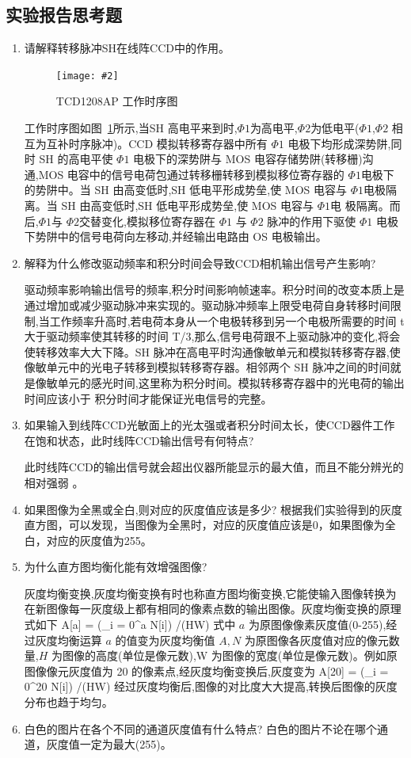 \documentclass{ctexart}
\newcommand{\cpic}[2]{
\begin{center}
\texttt{[image: \#2]}
\end{center}
}
\newcommand{\cpicn}[3]
{
\begin{figure}[H]
\cpic{#1}{#2}
\caption{#3\label{#2}}
\end{figure}
}
\begin{document}
\subsection{实验报告思考题}
\begin{enumerate}[(1)]
\item 请解释转移脉冲SH在线阵CCD中的作用。
\cpicn{0.5}{time}{TCD1208AP 工作时序图}
工作时序图如图~\ref{time}所示,当SH 高电平来到时,$\Phi 1$为高电平,$\Phi 2$为低电平($\Phi 1$,$\Phi 2$ 相互为互补时序脉冲)。CCD 模拟转移寄存器中所有 $\Phi 1$ 电极下均形成深势阱,同时 SH 的高电平使 $\Phi 1$ 电极下的深势阱与
MOS 电容存储势阱(转移栅)沟通,MOS 电容中的信号电荷包通过转移栅转移到模拟移位寄存器的 $\Phi 1$电极下的势阱中。当 SH 由高变低时,SH 低电平形成势垒,使 MOS 电容与 $\Phi 1$电极隔离。当 SH 由高变低时,SH 低电平形成势垒,使 MOS 电容与 $\Phi 1$电
极隔离。而后,$\Phi 1$与 $\Phi 2$交替变化,模拟移位寄存器在 $\Phi 1$ 与 $\Phi 2$ 脉冲的作用下驱使 $\Phi 1$
电极下势阱中的信号电荷向左移动,并经输出电路由 OS 电极输出。

\item 解释为什么修改驱动频率和积分时间会导致CCD相机输出信号产生影响?
  
  驱动频率影响输出信号的频率,积分时间影响帧速率。积分时间的改变本质上是通过增加或减少驱动脉冲来实现的。驱动脉冲频率上限受电荷自身转移时间限制,当工作频率升高时,若电荷本身从一个电极转移到另一个电极所需要的时间 t 大于驱动频率使其转移的时间 T/3,那么,信号电荷跟不上驱动脉冲的变化,将会使转移效率大大下降。SH 脉冲在高电平时沟通像敏单元和模拟转移寄存器,使像敏单元中的光电子转移到模拟转移寄存器。相邻两个 SH 脉冲之间的时间就是像敏单元的感光时间,这里称为积分时间。模拟转移寄存器中的光电荷的输出时间应该小于
积分时间才能保证光电信号的完整。

\item 如果输入到线阵CCD光敏面上的光太强或者积分时间太长，使CCD器件工作在饱和状态，此时线阵CCD输出信号有何特点?

  此时线阵CCD的输出信号就会超出仪器所能显示的最大值，而且不能分辨光的相对强弱 。
  
\item 如果图像为全黑或全白,则对应的灰度值应该是多少?
根据我们实验得到的灰度直方图，可以发现，当图像为全黑时，对应的灰度值应该是0，如果图像为全白，对应的灰度值为255。  
\item 为什么直方图均衡化能有效增强图像?

  灰度均衡变换,灰度均衡变换有时也称直方图均衡变换,它能使输入图像转换为
在新图像每一灰度级上都有相同的像素点数的输出图像。灰度均衡变换的原理式如下
\beq
A[a] = \left(\sum_{i = 0}^a  N[i]\right) /(H\cdot W)
\eeq
式中 $a$ 为原图像像素灰度值(0-255),经过灰度均衡运算 $a$ 的值变为灰度均衡值 $A,N$ 为原图像各灰度值对应的像元数量,$H$ 为图像的高度(单位是像元数),W 为图像的宽度(单位是像元数)。例如原图像像元灰度值为 20 的像素点,经灰度均衡变换后,灰度变为
\beq
A[20] = \left(\sum_{i = 0}^{20}  N[i]\right) /(H\cdot W)
\eeq
经过灰度均衡后,图像的对比度大大提高,转换后图像的灰度分布也趋于均匀。
\item 白色的图片在各个不同的通道灰度值有什么特点?
  白色的图片不论在哪个通道，灰度值一定为最大(255)。
\end{enumerate}





\end{document}
